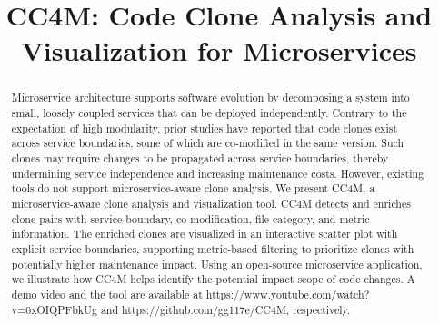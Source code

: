 \documentclass[conference]{IEEEtran}
\begin{document}
\title{CC4M: Code Clone Analysis and Visualization for Microservices}

\author{
}

\maketitle

\begin{abstract}
Microservice architecture supports software evolution by 
decomposing a system into small, loosely coupled services 
that can be deployed independently.
Contrary to the expectation of high modularity, prior studies have reported that code clones exist across service boundaries, some of which are co-modified in the same version.
Such clones may require changes to be propagated across service boundaries, 
thereby undermining service independence and increasing maintenance costs.
However, existing tools do not support microservice-aware clone analysis.
We present CC4M, a microservice-aware clone analysis and visualization
tool. 
CC4M detects and enriches clone pairs with service-boundary, co-modification, file-category, and metric information. The enriched clones are visualized in an interactive scatter plot with explicit service boundaries, supporting metric-based filtering to prioritize clones with potentially higher maintenance impact.
Using an open-source microservice application, we illustrate how CC4M
helps identify the potential impact scope of code changes. 
A demo video and the tool are available at https://www.youtube.com/watch?v=0xOIQPFbkUg and https://github.com/gg117e/CC4M, respectively.




\end{abstract}
\end{document}
